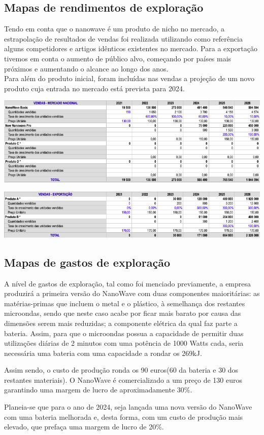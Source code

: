 \documentclass[a4paper]{article}
\begin{document}
\subsection{Mapas de rendimentos de exploração}
Tendo em conta que o nanowave é um produto de nicho no mercado, a estrapolação de resultados de vendas foi realizada utilizando como referência alguns competidores e artigos idênticos existentes no mercado. Para a exportação tivemos em conta o aumento de público alvo, começando por países mais próximos e aumentando o alcance ao longo dos anos.\\Para além do produto inicial, foram incluídas nas vendas a projeção de um novo produto cuja entrada no mercado está prevista para 2024.
\begin{center}
    \includegraphics[scale=0.5]{images/vendas_nacionais.png}
\end{center}

\begin{center}
    \includegraphics[scale=0.5]{images/vendas_exportacoes.png}
\end{center}

\subsection{Mapas de gastos de exploração}

A nível de gastos de exploração, tal como foi menciado previamente, a empresa produzirá a primeira versão do NanoWave com duas componentes maioritárias: as matérias-primas que incluem o metal e o plástico, à semelhança dos restantes microondas, sendo que neste caso acabe por ficar mais barato por causa das dimensões serem mais reduzidas; a componente elétrica da qual faz parte a bateria. Assim, para que o microondas possua a capacidade de permitir duas utilizações diárias de 2 minutos com uma potência de 1000 Watts cada, seria necessária uma bateria com uma capacidade a rondar os 269kJ. 
\par
Assim sendo, o custo de produção ronda os 90 euros(60 da bateria e 30 dos restantes materiais). O NanoWave é comercializado a um preço de 130 euros garantindo uma margem de lucro de aproximadamente 30\%.
\par
Planeia-se que para o ano de 2024, seja lançada uma nova versão do NanoWave com uma bateria melhorada e, desta forma, com um custo de produção mais elevado, que prefaça uma margem de lucro de 20\%.
\end{document}
